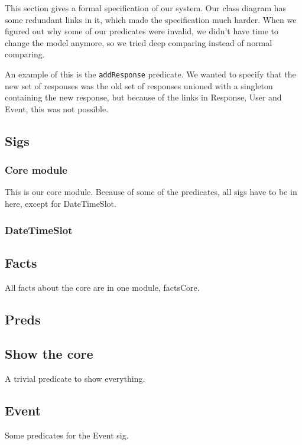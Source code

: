 This section gives a formal specification of our system. Our class diagram has some redundant links in it, which made the specification much harder. When we figured out why some of our predicates were invalid, we didn't have time to change the model anymore, so we tried deep comparing instead of normal comparing.

An example of this is the \texttt{addResponse} predicate. We wanted to specify that the new set of responses was the old set of responses unioned with a singleton containing the new response, but because of the links in Response, User and Event, this was not possible.

\subsection{Sigs}
	\subsubsection{Core module}
		This is our core module. Because of some of the predicates, all sigs have to be in here, except for DateTimeSlot.
	
		
	
	\subsubsection{DateTimeSlot}
	
		
	
\subsection{Facts}
	All facts about the core are in one module, factsCore.
	
	
	
\subsection{Preds}
	\subsection{Show the core}
		A trivial predicate to show everything.
		
		
		
	\subsection{Event}
		Some predicates for the Event sig.
		
